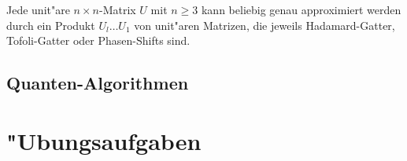 \begin{satz}
Jede unit"are $n\times n$-Matrix $U$ mit $n\ge 3$ kann beliebig genau
approximiert werden durch ein Produkt $U_l\dots U_1$ von unit"aren
Matrizen, die jeweils Hadamard-Gatter, Tofoli-Gatter oder Phasen-Shifts
sind.
\cite[Theorem 10.12]{skript:arorabarak}
\end{satz}

\subsection{Quanten-Algorithmen}

\section*{"Ubungsaufgaben}
\begin{uebungsaufgaben}
\item

\end{uebungsaufgaben}
